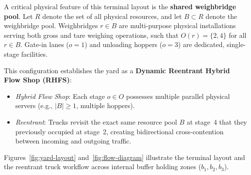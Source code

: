 \documentclass[11pt,a4paper]{article}
\begin{document}
A critical physical feature of this terminal layout is the \textbf{shared weighbridge pool}. Let $R$ denote the set of all physical resources, and let $B \subset R$ denote the weighbridge pool. Weighbridges $r \in B$ are multi-purpose physical installations serving both gross and tare weighing operations, such that $O(r) = \{2, 4\}$ for all $r \in B$. Gate-in lanes ($o=1$) and unloading hoppers ($o=3$) are dedicated, single-stage facilities. 

This configuration establishes the yard as a \textbf{Dynamic Reentrant Hybrid Flow Shop (RHFS)}:
\begin{itemize}[leftmargin=1.2cm,itemsep=0pt,topsep=2pt]
  \item \emph{Hybrid Flow Shop}: Each stage $o \in O$ possesses multiple parallel physical servers (e.g., $|B| \ge 1$, multiple hoppers).
  \item \emph{Reentrant}: Trucks revisit the exact same resource pool $B$ at stage~4 that they previously occupied at stage~2, creating bidirectional cross-contention between incoming and outgoing traffic.
\end{itemize}

Figures~\ref{fig:yard-layout} and~\ref{fig:flow-diagram} illustrate the terminal layout and the reentrant truck workflow across internal buffer holding zones ($b_1, b_2, b_3$).
\end{document}
